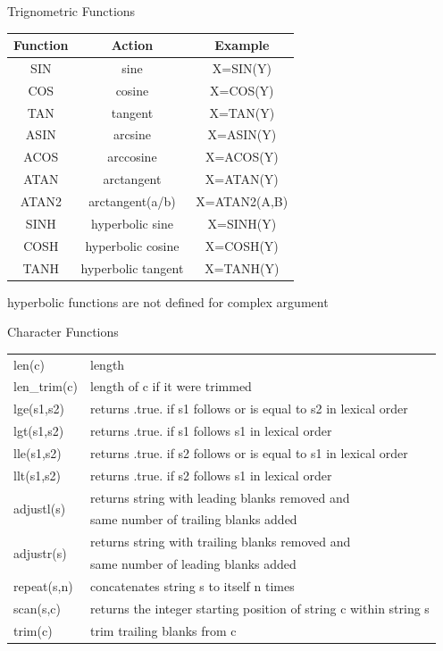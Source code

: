 \documentclass[10pt,t]{beamer}
\begin{document}
\begin{frame}{Trignometric Functions}
  \footnotesize
  \begin{center}
    \begin{tabular}{ccc}
      Function & Action & Example \\
      \hline
      SIN & sine & X=SIN(Y) \\
      COS & cosine & X=COS(Y) \\
      TAN & tangent & X=TAN(Y) \\
      ASIN & arcsine & X=ASIN(Y) \\
      ACOS & arccosine & X=ACOS(Y) \\
      ATAN & arctangent & X=ATAN(Y) \\
      ATAN2 & arctangent(a/b) & X=ATAN2(A,B) \\
      SINH & hyperbolic sine & X=SINH(Y) \\
      COSH & hyperbolic cosine & X=COSH(Y) \\
      TANH & hyperbolic tangent & X=TANH(Y) \\
      \hline
    \end{tabular}  
  
        {\tiny hyperbolic functions are not defined for complex argument}
  \end{center}
\end{frame}

\begin{frame}{Character Functions}
  \footnotesize
  \begin{center}
    \begin{tabular}{ll}
      \hline
      len(c) & length \\
      len\_trim(c) & length of c if it were trimmed \\
      lge(s1,s2) & returns .true. if s1 follows or is equal to s2 in lexical order \\
      lgt(s1,s2) & returns .true. if s1 follows s1 in lexical order \\
      lle(s1,s2) & returns .true. if s2 follows or is equal to s1 in lexical order \\
      llt(s1,s2) & returns .true. if s2 follows s1 in lexical order \\
      \multirow{2}{*}{adjustl(s)} & returns string with leading blanks removed and \\
      &   \quad same number of trailing blanks added \\
      \multirow{2}{*}{adjustr(s)} & returns string with trailing blanks removed and \\
      & \quad same number of leading blanks added \\
      repeat(s,n) & concatenates string s to itself n times \\
      scan(s,c) & returns the integer starting position of string c within string s \\
      trim(c) & trim trailing blanks from c \\
      \hline
    \end{tabular}
  \end{center}
\end{frame}
\end{document}
